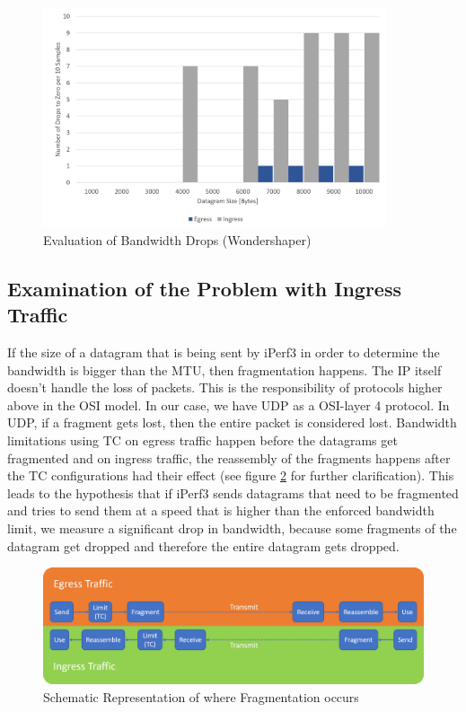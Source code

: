 \begin{figure}[h]
	\centering
	\includegraphics[width=0.9\textwidth]{img/Evaluation-Zeros-Wondershaper.png}
	\caption{Evaluation of Bandwidth Drops (Wondershaper)}
	\label{Evaluation of the Bandwidth Drops (Wondershaper)}
\end{figure}

\newpage

\subsection{Examination of the Problem with Ingress Traffic}\label{Examination of the Problem with Ingress Traffic}

If the size of a datagram that is being sent by iPerf3 in order to determine the bandwidth is bigger than the \acs{MTU}, then fragmentation happens. The \acl{IP} itself doesn't handle the loss of packets. This is the responsibility of protocols higher above in the \acs{OSI} model. In our case, we have \acs{UDP} as a  \acs{OSI}-layer 4 protocol. In \acs{UDP}, if a fragment gets lost, then the entire packet is considered lost. Bandwidth limitations using \acs{TC} on egress traffic happen before the datagrams get fragmented and on ingress traffic, the reassembly of the fragments happens after the \acs{TC} configurations had their effect (see figure \ref{Schematic Representation of where Fragmentation occurs} for further clarification). This leads to the hypothesis that if iPerf3 sends datagrams that need to be fragmented and tries to send them at a speed that is higher than the enforced bandwidth limit, we measure a significant drop in bandwidth, because some fragments of the datagram get dropped and therefore the entire datagram gets dropped.

\begin{figure}[h]
	\centering
	\includegraphics[width=\textwidth]{img/Fragmentation.png}
	\caption{Schematic Representation of where Fragmentation occurs}
	\label{Schematic Representation of where Fragmentation occurs}
\end{figure}

